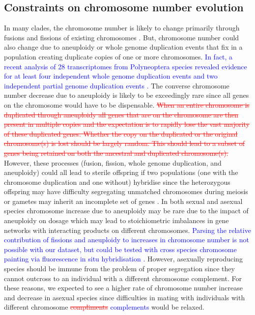 \documentclass[]{rsos}%
\begin{document}
\subsection{Constraints on chromosome number evolution}
In many clades, the chromosome number is likely to change primarily through fusions and fissions of existing chromosomes \cite{sved2016, blackmon2019meiotic}.
But, chromosome number could also change due to aneuploidy or whole genome duplication events that fix in a population creating duplicate copies of one or more chromosomes.
\textcolor{blue}{In fact, a recent analysis of 28 transcriptomes from Polyneoptera species revealed evidence for at least four independent whole genome duplication events and two independent partial genome duplication events \cite{li2018multiple}.}
The converse chromosome number decrease due to aneuploidy is likely to be exceedingly rare since all genes on the chromosome would have to be dispensable.
\textcolor{red}{\st{When an entire chromosome is duplicated through aneuploidy all genes that are on the chromosome are then present in multiple copies and the expectation is to rapidly lose the vast majority of these duplicated genes.
Whether the copy on the duplicated or the original chromosome(s) is lost should be largely random.
This should lead to a subset of genes being retained on both the ancestral and duplicated chromosome(s).}}
However, these processes (fusion, fission, whole genome duplication, and aneuploidy) could all lead to sterile offspring if two populations (one with the chromosome duplication and one without) hybridise since the heterozygous offspring may have difficulty segregating unmatched chromosomes during meiosis or gametes may inherit an incomplete set of genes \cite{white1978}.
In both sexual and asexual species chromosome increase due to aneuploidy may be rare due to the impact of aneuploidy on dosage which may lead to stoichiometric imbalances in gene networks with interacting products on different chromosomes.
\textcolor{blue}{Parsing the relative contribution of fissions and aneuploidy to increases in chromosome number is not possible with our dataset, but could be tested with cross species chromosome painting via fluorescence in situ hybridisation \cite{liehr2017new}.}
However, asexually reproducing species should be immune from the problem of proper segregation since they cannot outcross to an individual with a different chromosome complement. 
For these reasons, we expected to see a higher rate of chromosome number increase and decrease in asexual species since difficulties in mating with individuals with different chromosome \textcolor{red}{\st{compliments}} \textcolor{blue}{complements} would be relaxed.
\end{document}
